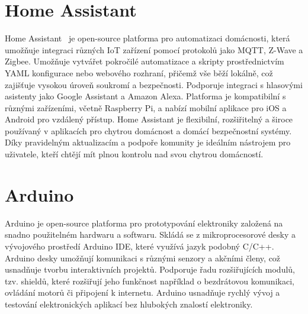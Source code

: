\section*{Home Assistant}\label{sec:home-assistant}
Home Assistant~\cite{co-je-to-ha} je open-source platforma pro automatizaci domácnosti, která umožňuje integraci různých IoT zařízení pomocí protokolů jako MQTT, Z-Wave a Zigbee.
Umožňuje vytvářet pokročilé automatizace a skripty prostřednictvím YAML konfigurace nebo webového rozhraní, přičemž vše běží lokálně, což zajišťuje vysokou úroveň soukromí a bezpečnosti.
Podporuje integraci s hlasovými asistenty jako Google Assistant a Amazon Alexa.
Platforma je kompatibilní s různými zařízeními, včetně Raspberry Pi, a nabízí mobilní aplikace pro iOS a Android pro vzdálený přístup.
Home Assistant je flexibilní, rozšiřitelný a široce používaný v aplikacích pro chytrou domácnost a domácí bezpečnostní systémy.
Díky pravidelným aktualizacím a podpoře komunity je ideálním nástrojem pro uživatele, kteří chtějí mít plnou kontrolu nad svou chytrou domácností.



\section*{Arduino}\label{sec:arduino}
Arduino je open-source platforma pro prototypování elektroniky založená na snadno použitelném hardwaru a softwaru.
Skládá se z mikroprocesorové desky a vývojového prostředí Arduino IDE, které využívá jazyk podobný C/C++.
Arduino desky umožňují komunikaci s různými senzory a akčními členy, což usnadňuje tvorbu interaktivních projektů.
Podporuje řadu rozšiřujících modulů, tzv. shieldů, které rozšiřují jeho funkčnost například o bezdrátovou komunikaci, ovládání motorů či připojení k internetu.
Arduino usnadňuje rychlý vývoj a testování elektronických aplikací bez hlubokých znalostí elektroniky.


